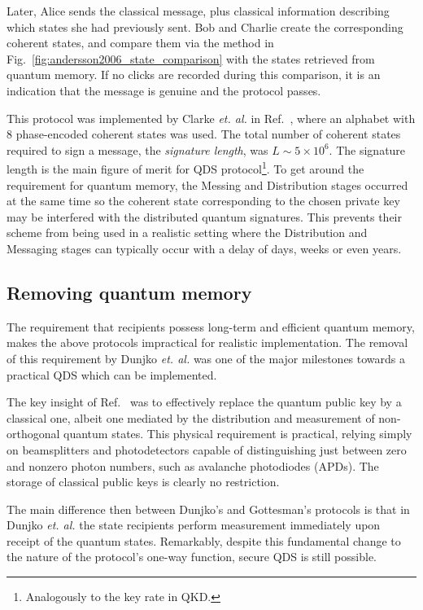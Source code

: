 Later, Alice sends the classical message, plus classical information describing which states she had previously sent. Bob and Charlie create the corresponding coherent states, and compare them via the method in Fig.~\ref{fig:andersson2006_state_comparison} with the states retrieved from quantum memory. If no clicks are recorded during this comparison, it is an indication that the message is genuine and the protocol passes.

This protocol was implemented by Clarke \emph{et. al.} in Ref.~\cite{Clarke2012}, where an alphabet with $8$ phase-encoded coherent states was used. The total number of coherent states required to sign a message, the \emph{signature length}, was $L \sim 5 \times 10^6$. The signature length is the main figure of merit for QDS protocol\footnote{Analogously to the key rate in QKD.}. To get around the requirement for quantum memory, the Messing and Distribution stages occurred at the same time so the coherent state corresponding to the chosen private key may be interfered with the distributed quantum signatures. This prevents their scheme from being used in a realistic setting where the Distribution and Messaging stages can typically occur with a delay of days, weeks or even years.


\subsection{Removing quantum memory}
The requirement that recipients possess long-term and efficient quantum memory, makes the above protocols impractical for realistic implementation. The removal of this requirement by Dunjko \emph{et. al.} \cite{Dunjko2014} was one of the major milestones towards a practical QDS which can be implemented. 

The key insight of Ref.~\cite{Dunjko2014} was to effectively replace the quantum public key by a classical one, albeit one mediated by the distribution and measurement of non-orthogonal quantum states. This physical requirement is practical, relying simply on beamsplitters and photodetectors capable of distinguishing just between zero and nonzero photon numbers, such as avalanche photodiodes (APDs). The storage of classical public keys is clearly no restriction. 

The main difference then between Dunjko's \cite{Dunjko2014} and Gottesman's \cite{Andersson2006} protocols is that in Dunjko \emph{et. al.} the state recipients perform measurement immediately upon receipt of the quantum states. Remarkably, despite this fundamental change to the nature of the protocol's one-way function, secure QDS is still possible. 


